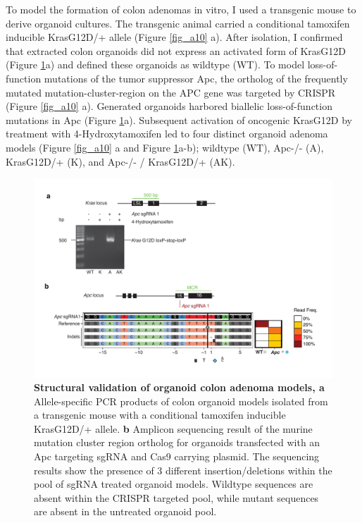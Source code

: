 \begin{flushleft}
To model the formation of colon adenomas in vitro, I used a transgenic mouse to derive organoid cultures. The transgenic animal carried a conditional tamoxifen inducible KrasG12D/+ allele \citep{Jackson2001-wv} (Figure \ref{fig_a10} a). After isolation, I confirmed that extracted colon organoids did not express an activated form of KrasG12D (Figure \ref{fig_a11}a) and defined these organoids as wildtype (WT). To model loss-of-function mutations of the tumor suppressor Apc, the ortholog of the frequently mutated mutation-cluster-region on the APC gene was targeted by CRISPR (Figure \ref{fig_a10} a). Generated organoids harbored biallelic loss-of-function mutations in Apc (Figure \ref{fig_a11}a). Subsequent activation of oncogenic KrasG12D by treatment with 4-Hydroxytamoxifen led to four distinct organoid adenoma models (Figure \ref{fig_a10} a and Figure \ref{fig_a11}a-b); wildtype (WT), Apc-/- (A), KrasG12D/+ (K), and Apc-/- / KrasG12D/+ (AK).


\begin{figure}[h]
\centering
\includegraphics[width=\textwidth,
                height=\textheight,
                keepaspectratio]{figures/adenomaprofiling/pdf/fig_1_1.pdf}
\caption[Structural validation of organoid colon adenoma models]{\textbf{Structural validation of organoid colon adenoma models, a} Allele-specific PCR products of colon organoid models isolated from a transgenic mouse with a conditional tamoxifen inducible KrasG12D/+ allele.
\textbf{b} Amplicon sequencing result of the murine mutation cluster region ortholog for organoids transfected with an Apc targeting sgRNA and Cas9 carrying plasmid. The sequencing results show the presence of 3 different insertion/deletions within the pool of sgRNA treated organoid models. Wildtype sequences are absent within the CRISPR targeted pool, while mutant sequences are absent in the untreated organoid pool.}
\label{fig_a11}
\end{figure}
\bigbreak


\end{flushleft}
